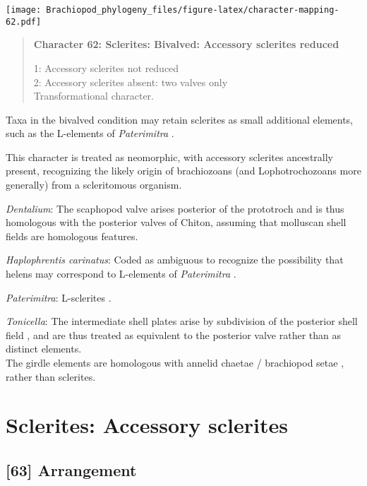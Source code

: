 \documentclass[openany]{book}
\theoremstyle{definition}
\theoremstyle{definition}
\theoremstyle{definition}
\theoremstyle{remark}
\begin{document}
\texttt{[image: Brachiopod\_phylogeny\_files/figure-latex/character-mapping-62.pdf]}

\begin{quote}
\textbf{Character 62: Sclerites: Bivalved: Accessory sclerites reduced}

1: Accessory sclerites not reduced\\
2: Accessory sclerites absent: two valves only\\
Transformational character.
\end{quote}

Taxa in the bivalved condition may retain sclerites as small additional
elements, such as the L-elements of \emph{Paterimitra}
\citep{Skovsted2015Theearly}.

This character is treated as neomorphic, with accessory sclerites
ancestrally present, recognizing the likely origin of brachiozoans (and
Lophotrochozoans more generally) from a scleritomous organism.

\hypertarget{Dentalium-coding-62}{}
\emph{Dentalium}: The scaphopod valve arises posterior of the prototroch
and is thus homologous with the posterior valves of Chiton, assuming
that molluscan shell fields are homologous features.

\hypertarget{Haplophrentis_carinatus-coding-62}{}
\emph{Haplophrentis carinatus}: Coded as ambiguous to recognize the
possibility that helens may correspond to L-elements of
\emph{Paterimitra} \citep{Moysiuk2017Hyolithsare}.

\hypertarget{Paterimitra-coding-62}{}
\emph{Paterimitra}: L-sclerites \citep{Skovsted2009Thescleritome}.

\hypertarget{Tonicella-coding-62}{}
\emph{Tonicella}: The intermediate shell plates arise by subdivision of
the posterior shell field \citep{Wanninger2002C}, and are thus treated
as equivalent to the posterior valve rather than as distinct elements.\\
The girdle elements are homologous with annelid chaetae / brachiopod
setae \citep{Leise1982}, rather than sclerites.

\section{Sclerites: Accessory
sclerites}\label{sclerites-accessory-sclerites}

\subsection*{{[}63{]} Arrangement}\label{arrangement}
\end{document}

